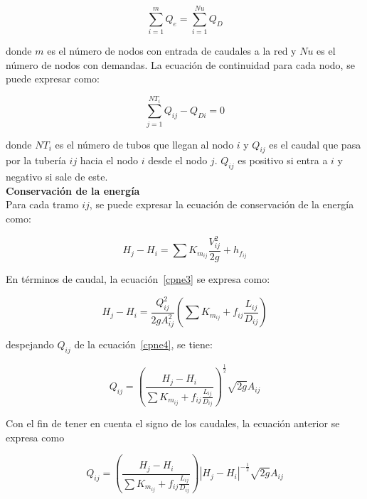 \documentclass[11pt, oneside]{article}
\begin{document}
\begin{equation}
\sum_{i=1}^{m} Q_{e} =  \sum_{i=1}^{Nu} Q_{D}
\label{cpne1}
\end{equation}

donde $m$ es el n\'umero de nodos con entrada de caudales a la red y $Nu$ es el n\'umero de nodos con demandas. La ecuaci\'on de continuidad para cada nodo, se puede expresar como:

\begin{equation}
\sum_{j=1}^{NT_i} Q_{ij} - Q_{Di} = 0
\label{cpne2}
\end{equation}

donde $NT_i$ es el n\'umero de tubos que llegan al nodo $i$ y $Q_{ij}$ es el caudal que pasa por la tuber\'ia $ij$ hacia el nodo $i$ desde el nodo $j$. $Q_{ij}$ es positivo si entra a $i$ y negativo si sale de este. \\

\textbf{Conservaci\'on de la energ\'ia}\\

Para cada tramo $ij$, se puede expresar la ecuaci\'on de conservaci\'on de la energ\'ia como:

\begin{equation}
H_j - H_i = \sum K_{m_{ij}} \frac{V_{ij}^2}{2g} + h_{f_{ij}}
\label{cpne3}
\end{equation}

En t\'erminos de caudal, la ecuaci\'on~\ref{cpne3} se expresa como:

\begin{equation}
H_j - H_i = \frac{Q_{ij}^2}{2gA_{ij}^2}\left( \sum K_{m_{ij}}  + f_{ij}\frac{L_{ij}}{D_{ij}} \right)
\label{cpne4}
\end{equation}

despejando $Q_{ij}$ de la ecuaci\'on~\ref{cpne4}, se tiene:

\begin{equation}
Q_{ij} = \left(\frac{H_j - H_i }{\sum K_{m_{ij}}  + f_{ij}\frac{L_{ij}}{D_{ij}} } \right)^{\frac{1}{2}} \sqrt{2g} A_{ij}
\label{cpne5}
\end{equation}

Con el fin de tener en cuenta el signo de los caudales, la ecuaci\'on anterior se expresa como 

\begin{equation}
Q_{ij} = \left(\frac{H_j - H_i }{\sum K_{m_{ij}}  + f_{ij}\frac{L_{ij}}{D_{ij}} } \right) |H_j - H_i|^{-\frac{1}{2}} \sqrt{2g} A_{ij}
\label{cpne6}
\end{equation}
\end{document}
